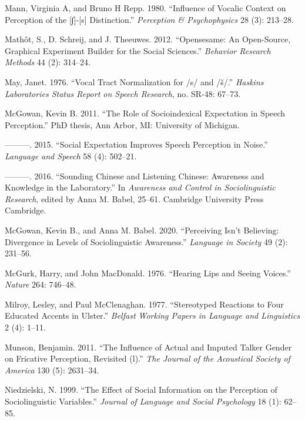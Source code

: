 \documentclass[
  letterpaper,
  DIV=11,
  numbers=noendperiod]{scrartcl}
\newlength{\cslhangindent}
\newenvironment{CSLReferences}[2] %
 {\begin{list}{}{%
  \setlength{\itemindent}{0pt}
  \setlength{\leftmargin}{0pt}
  \setlength{\parsep}{0pt}
  \ifodd #1
   \setlength{\leftmargin}{\cslhangindent}
   \setlength{\itemindent}{-1\cslhangindent}
  \fi
  \setlength{\itemsep}{#2\baselineskip}}}
 {\end{list}}
\begin{document}
\begin{CSLReferences}{1}{0}
Mann, Virginia A, and Bruno H Repp. 1980. {``Influence of Vocalic
Context on Perception of the {[}∫{]}-{[}s{]} Distinction.''}
\emph{Perception \& Psychophysics} 28 (3): 213--28.

Mathôt, S., D. Schreij, and J. Theeuwes. 2012. {``Opensesame: An
Open-Source, Graphical Experiment Builder for the Social Sciences.''}
\emph{Behavior Research Methods} 44 (2): 314--24.

May, Janet. 1976. {``Vocal Tract Normalization for /s/ and /š/.''}
\emph{Haskins Laboratories Status Report on Speech Research}, no. SR-48:
67--73.

McGowan, Kevin B. 2011. {``The Role of Socioindexical Expectation in
Speech Perception.''} PhD thesis, Ann Arbor, MI: University of Michigan.

---------. 2015. {``Social Expectation Improves Speech Perception in
Noise.''} \emph{Language and Speech} 58 (4): 502--21.

---------. 2016. {``Sounding Chinese and Listening Chinese: Awareness
and Knowledge in the Laboratory.''} In \emph{Awareness and Control in
Sociolinguistic Research}, edited by Anna M. Babel, 25--61. Cambridge
University Press Cambridge.

McGowan, Kevin B., and Anna M. Babel. 2020. {``Perceiving Isn't
Believing: Divergence in Levels of Sociolinguistic Awareness.''}
\emph{Language in Society} 49 (2): 231--56.

McGurk, Harry, and John MacDonald. 1976. {``Hearing Lips and Seeing
Voices.''} \emph{Nature} 264: 746--48.

Milroy, Lesley, and Paul McClenaghan. 1977. {``Stereotyped Reactions to
Four Educated Accents in Ulster.''} \emph{Belfast Working Papers in
Language and Linguistics} 2 (4): 1--11.

Munson, Benjamin. 2011. {``The Influence of Actual and Imputed Talker
Gender on Fricative Perception, Revisited (l).''} \emph{The Journal of
the Acoustical Society of America} 130 (5): 2631--34.

Niedzielski, N. 1999. {``The Effect of Social Information on the
Perception of Sociolinguistic Variables.''} \emph{Journal of Language
and Social Psychology} 18 (1): 62--85.


\end{CSLReferences}
\end{document}

